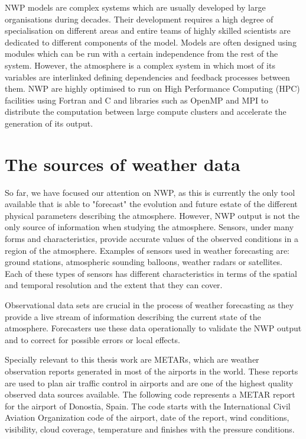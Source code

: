 \medskip

NWP models are complex systems which are usually developed by large organisations during decades. Their development requires a high degree of specialisation on different areas and entire teams of highly skilled scientists are dedicated to different components of the model. Models are often designed using modules which can be run with a certain independence from the rest of the system. However, the atmosphere is a complex system in which most of its variables are interlinked defining dependencies and feedback processes between them. NWP are highly optimised to run on High Performance Computing (HPC) facilities using Fortran and C and libraries such as OpenMP \citep{dagum1998openmp} and MPI \citep{gropp1999using} to distribute the computation between large compute clusters and accelerate the generation of its output. 


\section{The sources of weather data}

So far, we have focused our attention on NWP, as this is currently the only tool available that is able to "forecast" the evolution and future estate of the different physical parameters describing the atmosphere. However, NWP output is not the only source of information when studying the atmosphere. Sensors, under many forms and characteristics, provide accurate values of the observed conditions in a region of the atmosphere. Examples of sensors used in weather forecasting are: ground stations, atmospheric sounding balloons, weather radars or satellites. Each of these types of sensors has different characteristics in terms of the spatial and temporal resolution and the extent that they can cover.

\medskip

Observational data sets are crucial in the process of weather forecasting as they provide a live stream of information describing the current state of the atmosphere. Forecasters use these data operationally to validate the NWP output and to correct for possible errors or local effects. 

\medskip

Specially relevant to this thesis work are METARs, which are weather observation reports generated in most of the airports in the world. These reports are used to plan air traffic control in airports and are one of the highest quality observed data sources available. The following code represents a METAR report for the airport of Donostia, Spain. The code starts with the International Civil Aviation Organization code of the airport, date of the report, wind conditions, visibility, cloud coverage, temperature and finishes with the pressure conditions.

